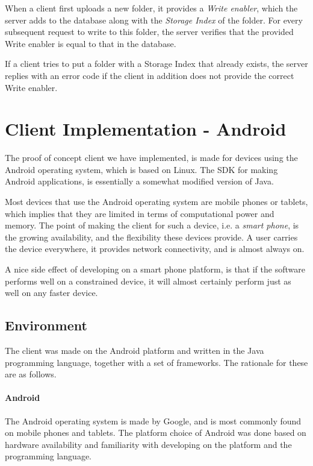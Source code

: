 \documentclass[pdftex,english,10pt,b5paper,twoside]{book}
\begin{document}
When a client first uploads a new folder, it provides a \emph{Write enabler},
which the server adds to the database along with the \emph{Storage Index} of
the folder.  For every subsequent request to write to this folder, the server
verifies that the provided Write enabler is equal to that in the database.

If a client tries to put a folder with a Storage Index that already exists, the
server replies with an error code if the client in addition does not provide
the correct Write enabler.

\section{Client Implementation - Android}

The proof of concept client we have implemented, is made for devices using the
Android operating system, which is based on Linux. The \ac{SDK} for making
Android applications, is essentially a somewhat modified version of Java.

Most devices that use the Android operating system are mobile phones or
tablets, which implies that they are limited in terms of computational power
and memory. The point of making the client for such a device, i.e. a
\emph{smart phone}, is the growing availability, and the flexibility these
devices provide. A user carries the device everywhere, it provides network
connectivity, and is almost always on.

A nice side effect of developing on a smart phone platform, is that if the
software performs well on a constrained device, it will almost certainly
perform just as well on any faster device.

\subsection{Environment}

The client was made on the Android platform and written in the Java programming
language, together with a set of frameworks. The rationale for these are as
follows.

\paragraph{Android} The Android operating system is made by Google, and is most
commonly found on mobile phones and tablets. The platform choice of Android was
done based on hardware availability and familiarity with developing on the
platform and the programming language.
\end{document}
